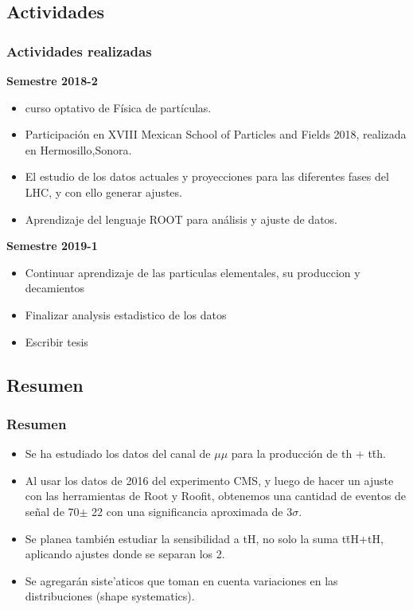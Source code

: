 \documentclass[11pt]{beamer}
\begin{document}
\begin{frame}
\section{Actividades}
\frametitle{Actividades realizadas}
\scriptsize{
\textbf{Semestre 2018-2}
\begin{itemize}
	\item curso optativo de F\'isica de part\'iculas.
	\item Participaci\'on en XVIII Mexican School of Particles and Fields 2018, realizada en Hermosillo,Sonora. 

	\item El estudio de los datos actuales y proyecciones para las diferentes fases del
	LHC, y con ello generar ajustes.
	\item Aprendizaje del lenguaje ROOT para an\'alisis y ajuste de datos.
\end{itemize}
\vspace{4mm}
\textbf{Semestre 2019-1}
\begin{itemize}
	\item Continuar aprendizaje de las particulas elementales, su produccion y decamientos
	\item Finalizar analysis estadistico de los datos
	\item Escribir tesis
\end{itemize}
}
\end{frame}



\begin{frame}
\section{Resumen}
\frametitle{Resumen}
\begin{itemize}
\item Se ha estudiado los datos del canal de $\mu \mu$ para la producción de th + t\=th.
\item Al usar los datos de 2016 del experimento CMS, y luego de hacer un ajuste con las herramientas de Root y Roofit, obtenemos una cantidad de  eventos de se\~nal de  70$\pm$ 22 con una significancia  aproximada de $3\sigma$.
\item Se planea tambi\'en estudiar la sensibilidad a tH, no solo la suma t\=tH+tH, aplicando ajustes donde se separan los 2. 
\item  Se agregar\'an siste'aticos que toman en cuenta variaciones en las distribuciones (shape systematics).
\end{itemize}	
\end{frame}
\end{document}
